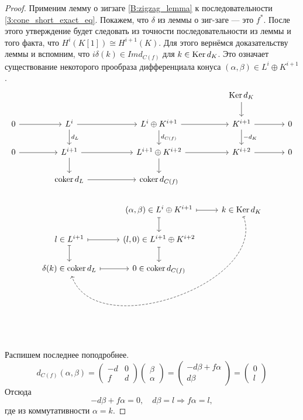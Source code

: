 \documentclass[../main.tex]{subfiles}
\begin{document}
\begin{proof}
  Применим лемму о зигзаге \ref{B:zigzag_lemma} к последовательности \eqref{3:cone_short_exact_eq}. Покажем, что $\delta$ из леммы о зиг-заге --- это $f^*$. После этого утверждение будет следовать из точности последовательности из леммы и того факта, что $H^i(K[1])\cong H^{i+1}(K)$.
  Для этого вернёмся доказательству леммы и вспомним, что $i\delta(k) \in Im d_{C(f)}$ для $k\in \mathop{\mathrm{Ker}}\nolimits d_K$. Это означает существование некоторого прообраза дифференциала конуса $(\alpha, \beta) \in L^i\oplus K^{i+1}$.
  \begin{equation*}
\begin{tikzcd}
	&&& {\Ker d_K} \\
	0 & {L^i} & {L^i\oplus K^{i+1}} & {K^{i+1}} & 0 \\
	0 & {L^{i+1}} & {L^{i+1}\oplus K^{i+2}} & {K^{i+2}} & 0 \\
	& {\coker d_L} & {\coker d_{C(f)}} \\
	&& {(\alpha, \beta)\in L^i\oplus K^{i+1}} & {k\in \Ker d_K} \\
	& {l\in L^{i+1}} & {(l, 0)\in L^{i+1}\oplus K^{i+2}} \\
	& {\delta(k)\in \coker d_L} & {0\in \coker d_{C(f)}}
	\arrow["{-d_K}", from=2-4, to=3-4]
	\arrow[from=2-1, to=2-2]
	\arrow[from=2-2, to=2-3]
	\arrow[from=2-3, to=2-4]
	\arrow[from=2-4, to=2-5]
	\arrow[from=1-4, to=2-4]
	\arrow[from=3-1, to=3-2]
	\arrow[from=3-2, to=3-3]
	\arrow[from=3-3, to=3-4]
	\arrow[from=3-4, to=3-5]
	\arrow["{d_{C(f)}}", from=2-3, to=3-3]
	\arrow["{d_L}", from=2-2, to=3-2]
	\arrow[from=3-2, to=4-2]
	\arrow[from=4-2, to=4-3]
	\arrow[from=3-3, to=4-3]
	\arrow[dashed, maps to, from=5-4, to=7-2, bend left=90]
	\arrow[maps to, from=7-2, to=7-3]
	\arrow[maps to, from=6-2, to=7-2]
	\arrow[maps to, from=6-2, to=6-3]
	\arrow[maps to, from=5-3, to=6-3]
	\arrow[maps to, from=6-3, to=7-3]
	\arrow[maps to, from=5-3, to=5-4]
\end{tikzcd}
  \end{equation*}
  Распишем последнее поподробнее.
  \begin{equation*}
    d_{C(f)}(\alpha, \beta) = \begin{pmatrix}-d&0\\f&d\end{pmatrix}\begin{pmatrix}\beta\\ \alpha\end{pmatrix} = \begin{pmatrix}-d\beta + f\alpha\\d\beta\end{pmatrix}=\begin{pmatrix}0\\l\end{pmatrix}
\end{equation*}
Отсюда
\begin{equation*}
  -d\beta + f\alpha = 0, \quad d\beta=l\Rightarrow f\alpha = l,
\end{equation*}
где из коммутативности $\alpha = k$.
\end{proof}
\end{document}
